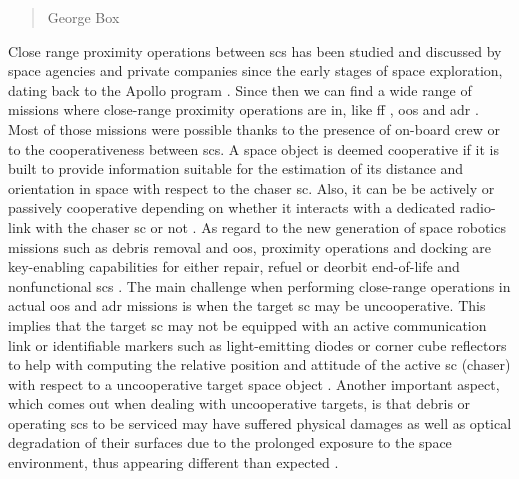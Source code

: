 \begin{quotation}
  {\footnotesize
    \begin{flushright}
      George Box
    \end{flushright}
  }
\end{quotation}
\vspace{0.5cm}

Close range proximity operations between \acrfull{sc}s has been studied and discussed by space agencies and private companies since the early stages of space exploration, dating back to the Apollo program \cite{LangleyApollo}.
Since then we can find a wide range of missions where close-range proximity operations are in, like \acrfull{ff} \cite{2001FormationFliying}  \cite{2009FormationFliying}, \acrfull{oos} \cite{auricchio} \cite{Zimpfer2005} \cite{Tatsch2006} \cite{FloresAbad2014} and \acrfull{adr} \cite{clerc2012astrium} \cite{Bonnal2013}.
Most of those missions were possible thanks to the presence of on-board crew or to the cooperativeness between \acrshort{sc}s.
A space object is deemed cooperative if it is built to provide information suitable for the estimation of its distance and orientation in space with respect to the chaser \acrshort{sc}. Also, it can be be actively or passively cooperative depending on whether it interacts with a dedicated radio-link with the chaser \acrshort{sc} or not \cite{Opromolla2017}.
As regard to the new generation of space robotics missions such as debris removal and \acrshort{oos}, proximity operations and docking are key-enabling capabilities for either repair, refuel or deorbit end-of-life and nonfunctional \acrshort{sc}s \cite{2016Ventura}.
The main challenge when performing close-range operations in actual \acrshort{oos} and \acrshort{adr} missions is when the target \acrshort{sc} may be uncooperative.
This implies that the target \acrshort{sc} may not be equipped with an active communication link or identifiable markers such as light-emitting diodes or corner cube reflectors to help with computing the relative position and attitude of the active \acrshort{sc} (chaser) with respect to a uncooperative target space object \cite{2019phdSharma}.
Another important aspect, which comes out when dealing with uncooperative targets, is that debris or operating \acrshort{sc}s to be serviced may have suffered physical damages as well as optical degradation of their surfaces due to the prolonged exposure to the space environment, thus appearing different than expected \cite{Opromolla2017}.

